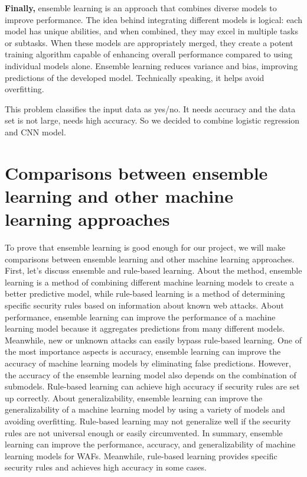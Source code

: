 \textbf{Finally,}
ensemble learning is an approach that combines diverse models to improve performance. The idea behind integrating different models is logical: each model has unique abilities, and when combined, they may excel in multiple tasks or subtasks. When these models are appropriately merged, they create a potent training algorithm capable of enhancing overall performance compared to using individual models alone.
Ensemble learning reduces variance and bias, improving predictions of the developed model. Technically speaking, it helps avoid overfitting.

This problem classifies the input data as yes/no. It needs accuracy and the data set is not large, needs high accuracy. So we decided to combine logistic regression and CNN model.

\section{Comparisons between ensemble learning and other machine learning approaches} 

\hspace{0.5cm}To prove that ensemble learning is good enough for our project, we will make comparisons between ensemble learning and other machine learning approaches.
First, let's discuss ensemble and rule-based learning. About the method, ensemble learning is a method of combining different machine learning models to create a better predictive model, while rule-based learning is a method of determining specific security rules based on information about known web attacks. About performance, ensemble learning can improve the performance of a machine learning model because it aggregates predictions from many different models. Meanwhile, new or unknown attacks can easily bypass rule-based learning. One of the most importance aspects is accuracy,
ensemble learning can improve the accuracy of machine learning models by eliminating false predictions. However, the accuracy of the ensemble learning model also depends on the combination of submodels. Rule-based learning can achieve high accuracy if security rules are set up correctly.
About generalizability, ensemble learning can improve the generalizability of a machine learning model by using a variety of models and avoiding overfitting. Rule-based learning may not generalize well if the security rules are not universal enough or easily circumvented. In summary, ensemble learning can improve the performance, accuracy, and generalizability of machine learning models for WAFs. Meanwhile, rule-based learning provides specific security rules and achieves high accuracy in some cases.

